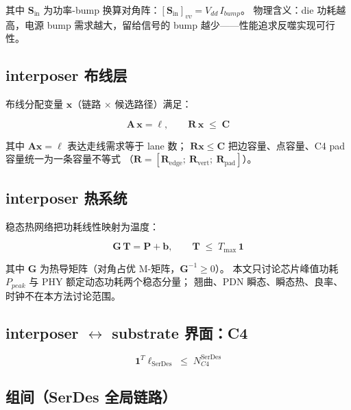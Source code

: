 其中 $\mathbf{S}_{\text{in}}$ 为功率-bump 换算对角阵：$[\mathbf{S}_{\text{in}}]_{vv} = V_{dd}\,I_{bump}$。
物理含义：die 功耗越高，电源 bump 需求越大，留给信号的 bump 越少——性能追求反噬实现可行性。

\subsection{interposer 布线层}\label{sec:ov-wiring}

布线分配变量 $\mathbf{x}$（链路 $\times$ 候选路径）满足：

\begin{equation}\label{eq:wiring}
    \mathbf{A}\,\mathbf{x} = \boldsymbol{\ell},\qquad
    \mathbf{R}\,\mathbf{x} \;\le\; \mathbf{C}
\end{equation}

其中 $\mathbf{A}\mathbf{x}=\boldsymbol{\ell}$ 表达走线需求等于 lane 数；
$\mathbf{R}\mathbf{x}\le\mathbf{C}$ 把边容量、点容量、C4 pad 容量统一为一条容量不等式
（$\mathbf{R}=[\mathbf{R}_{\text{edge}};\ \mathbf{R}_{\text{vert}};\ \mathbf{R}_{\text{pad}}]$）。

\subsection{interposer 热系统}\label{sec:ov-thermal}

稳态热网络把功耗线性映射为温度：

\begin{equation}\label{eq:thermal}
    \mathbf{G}\,\mathbf{T} = \mathbf{P} + \mathbf{b},\qquad
    \mathbf{T} \;\le\; T_{\max}\,\mathbf{1}
\end{equation}

其中 $\mathbf{G}$ 为热导矩阵（对角占优 M-矩阵，$\mathbf{G}^{-1}\ge 0$）。
本文只讨论芯片峰值功耗 $P_{peak}$ 与 PHY 额定动态功耗两个稳态分量；
翘曲、PDN 瞬态、瞬态热、良率、时钟不在本方法讨论范围。

\subsection{interposer $\leftrightarrow$ substrate 界面：C4}\label{sec:ov-c4}

\begin{equation}\label{eq:c4}
    \mathbf{1}^T \boldsymbol{\ell}_{\text{SerDes}} \;\le\; N_{C4}^{\text{SerDes}}
\end{equation}

\subsection{组间（SerDes 全局链路）}\label{sec:ov-intergroup}


